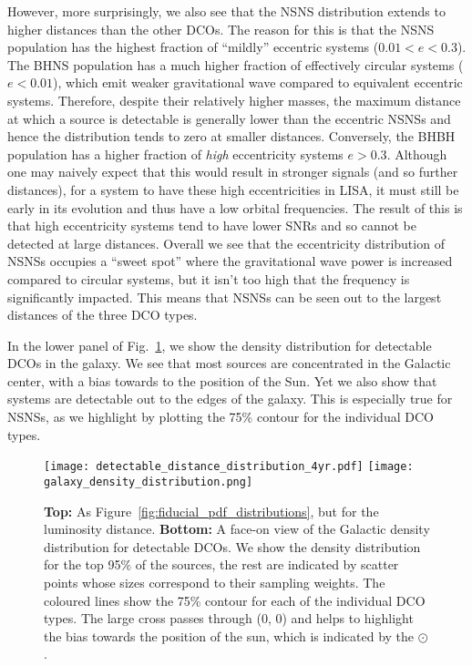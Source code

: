 However, more surprisingly, we also see that the NSNS distribution extends to higher distances than the other DCOs. The reason for this is that the NSNS population has the highest fraction of ``mildly'' eccentric systems ($0.01 < e < 0.3$). The BHNS population has a much higher fraction of effectively circular systems ($e < 0.01$), which emit weaker gravitational wave compared to equivalent eccentric systems. Therefore, despite their relatively higher masses, the maximum distance at which a source is detectable is generally lower than the eccentric NSNSs and hence the distribution tends to zero at smaller distances. Conversely, the BHBH population has a higher fraction of \textit{high} eccentricity systems $e > 0.3$. Although one may naively expect that this would result in stronger signals (and so further distances), for a system to have these high eccentricities in LISA, it must still be early in its evolution and thus have a low orbital frequencies. The result of this is that high eccentricity systems tend to have lower SNRs and so cannot be detected at large distances. Overall we see that the eccentricity distribution of NSNSs occupies a ``sweet spot'' where the gravitational wave power is increased compared to circular systems, but it isn't too high that the frequency is significantly impacted. This means that NSNSs can be seen out to the largest distances of the three DCO types.

In the lower panel of Fig.~\ref{fig:detectable_distance_dist}, we show the density distribution for detectable DCOs in the galaxy. We see that most sources are concentrated in the Galactic center, with a bias towards to the position of the Sun. Yet we also show that systems are detectable out to the edges of the galaxy. This is especially true for NSNSs, as we highlight by plotting the 75\% contour for the individual DCO types.

\begin{figure}[thb]
    \centering
    \texttt{[image: detectable\_distance\_distribution\_4yr.pdf]}
    \texttt{[image: galaxy\_density\_distribution.png]}
    \caption{\textbf{Top:} As Figure~\ref{fig:fiducial_pdf_distributions}, but for the luminosity distance. \textbf{Bottom:} A face-on view of the Galactic density distribution for detectable DCOs. We show the density distribution for the top 95\% of the sources, the rest are indicated by scatter points whose sizes correspond to their sampling weights. The coloured lines show the 75\% contour for each of the individual DCO types. The large cross passes through (0, 0) and helps to highlight the bias towards the position of the sun, which is indicated by the $\odot$.}
    \label{fig:detectable_distance_dist}
\end{figure}

